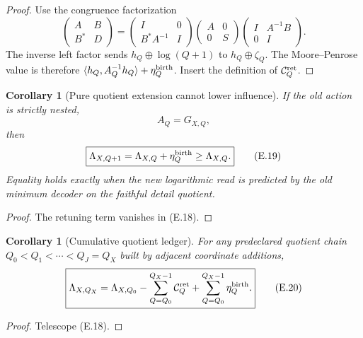 \documentclass[11pt]{article}
\newtheorem{corollary}[theorem]{Corollary}
\theoremstyle{definition}
\theoremstyle{remark}
\begin{document}
\begin{proof}
Use the congruence factorization
\[
 \begin{pmatrix}A&B\\B^*&D\end{pmatrix}
 =\begin{pmatrix}I&0\\B^*A^{-1}&I\end{pmatrix}
  \begin{pmatrix}A&0\\0&S\end{pmatrix}
  \begin{pmatrix}I&A^{-1}B\\0&I\end{pmatrix}.
\]
The inverse left factor sends $h_Q\oplus\log(Q+1)$ to
$h_Q\oplus\zeta_Q$.  The Moore--Penrose value is therefore
$\langle h_Q,A_Q^{-1}h_Q\rangle+\eta_Q^{\rm birth}$.  Insert the definition of
$\mathcal C_Q^{\rm ret}$.
\end{proof}

\begin{corollary}[Pure quotient extension cannot lower influence]
\label{cor:affend-pure-extension}
If the old action is strictly nested,
\[
 \boxed{A_Q=G_{X,Q},}
\]
then
\begin{equation}
 \label{eq:affend-pure-extension}
 \boxed{
 \Lambda_{X,Q+1}
 =\Lambda_{X,Q}+\eta_Q^{\rm birth}
 \ge\Lambda_{X,Q}.}
 \tag{E.19}
\end{equation}
Equality holds exactly when the new logarithmic read is predicted by the old
minimum decoder on the faithful detail quotient.
\end{corollary}

\begin{proof}
The retuning term vanishes in \textup{(E.18)}.
\end{proof}

\begin{corollary}[Cumulative quotient ledger]
\label{cor:affend-quotient-telescope}
For any predeclared quotient chain $Q_0<Q_1<\cdots<Q_J=Q_X$ built by adjacent
coordinate additions,
\begin{equation}
 \label{eq:affend-quotient-telescope}
 \boxed{
 \Lambda_{X,Q_X}
 =\Lambda_{X,Q_0}
  -\sum_{Q=Q_0}^{Q_X-1}\mathcal C_Q^{\rm ret}
  +\sum_{Q=Q_0}^{Q_X-1}\eta_Q^{\rm birth}.}
 \tag{E.20}
\end{equation}
\end{corollary}

\begin{proof}
Telescope \textup{(E.18)}.
\end{proof}
\end{document}
